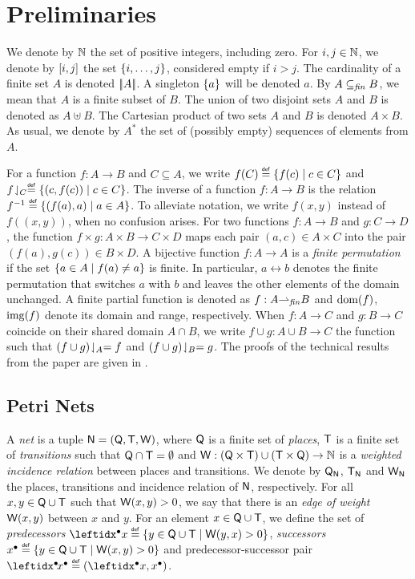 \section{Preliminaries}

We denote by $\mathbb{N}$ the set of positive integers, including zero. For
$i, j \in \mathbb{N}$, we denote by ${[{i},{j}]}$ the set
${\{ {i,\ldots,j} \}}$, considered empty if $i > j$. The cardinality of a
finite set $A$ is denoted $|\!|{A}|\!|$. A singleton ${\{ {a} \}}$ will be
denoted $a$. By $A \subseteq_{\mathit{fin}} B$, we mean that $A$ is a finite
subset of $B$. The union of two disjoint sets $A$ and $B$ is denoted
as $A \uplus B$. The Cartesian product of two sets $A$ and $B$ is
denoted $A \times B$. As usual, we denote by $A^*$ the set of
(possibly empty) sequences of elements from $A$.

For a function $f : A \rightarrow B$ and $C \subseteq A$, we write
$f(C)\stackrel{\scriptscriptstyle{\mathsf{def}}}{=} {\{ {f(c) \mid c \in C} \}}$ and ${f}\!\downharpoonleft_{C} \stackrel{\scriptscriptstyle{\mathsf{def}}}{=}
{\{ {(c,f(c)) \mid c \in C} \}}$. The inverse of a function $f : A
\rightarrow B$ is the relation $f^{-1}\stackrel{\scriptscriptstyle{\mathsf{def}}}{=}\{(f(a),a) \mid a \in
A\}$. To alleviate notation, we write $f(x,y)$ instead of $f((x,y))$,
when no confusion arises. For two functions $f : A \rightarrow B$ and
$g : C \rightarrow D$, the function $f \times g : A \times B
\rightarrow C \times D$ maps each pair $(a,c) \in A \times C$ into the
pair $(f(a),g(c))\in B \times D$. A bijective function $f : A
\rightarrow A$ is a \emph{finite permutation} if the set ${\{ {a \in A
  \mid f(a)\neq a} \}}$ is finite.  In particular, $a \leftrightarrow b$
denotes the finite permutation that switches $a$ with $b$ and leaves
the other elements of the domain unchanged. A finite partial function
is denoted as $f : A {\rightharpoonup_{\mathit{fin}}} B$ and ${\mathrm{dom}({f})}$, ${\mathrm{img}({f})}$ denote its
domain and range, respectively.  When $f : A \to C$ and $g : B \to C$
coincide on their shared domain $A \cap B$, we write $f \cup g : A
\cup B \to C$ the function such that ${(f \cup g)}\!\downharpoonleft_{A} = f$ and
${(f \cup g)}\!\downharpoonleft_{B} = g$.
\ifLongVersion\else
The proofs of the technical results from the paper are given in
.
\fi

\subsection{Petri Nets}

A \emph{net} is a tuple $\mathsf{N} = (\mathsf{Q},\mathsf{T},\mathsf{W})$, where
$\mathsf{Q}$ is a finite set of \emph{places}, $\mathsf{T}$ is a finite set
of \emph{transitions} such that $\mathsf{Q}\cap\mathsf{T}=\emptyset$ and
$\mathsf{W} : (\mathsf{Q} \times \mathsf{T}) \cup (\mathsf{T} \times \mathsf{Q})
\rightarrow \mathbb{N}$ is a \emph{weighted incidence relation} between
places and transitions. We denote by $\mathsf{Q}_{\mathsf{N}}$,
$\mathsf{T}_{\mathsf{N}}$ and $\mathsf{W}_{\mathsf{N}}$ the places, transitions and
incidence relation of $\mathsf{N}$, respectively. For all
$x,y\in\mathsf{Q}\cup\mathsf{T}$ such that $\mathsf{W}(x,y) > 0$, we say that
there is an \emph{edge of weight} $\mathsf{W}(x,y)$ between $x$ and
$y$. For an element $x\in\mathsf{Q}\cup\mathsf{T}$, we define the set of
\emph{predecessors} $\pre{x} \isdef \set{y \in \places \cup \trans
  \mid \weight(y,x)>0}$, \emph{successors} $\text{${x}$}^\bullet \stackrel{\scriptscriptstyle{\mathsf{def}}}{=} {\{ {y \in
  \mathsf{Q} \cup \mathsf{T} \mid \mathsf{W}(x,y)>0} \}}$ and predecessor-successor
pair $\prepost{x} \isdef (\pre{x},\post{x})$.

